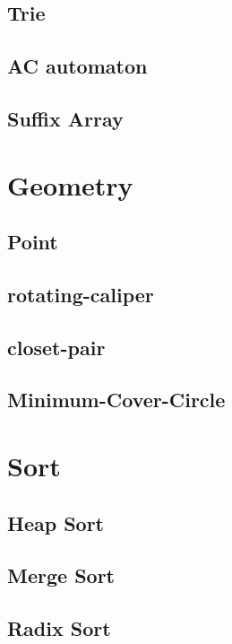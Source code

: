 \documentclass[a4paper,10pt,twocolumn,oneside]{article}
\begin{document}
\subsection{Trie}

\subsection{AC automaton}

\subsection{Suffix Array}


\section{Geometry}
\subsection{Point}

\subsection{rotating-caliper}

\subsection{closet-pair}

\subsection{Minimum-Cover-Circle}


\section{Sort}
\subsection{Heap Sort}

\subsection{Merge Sort}

\subsection{Radix Sort}

\end{document}

